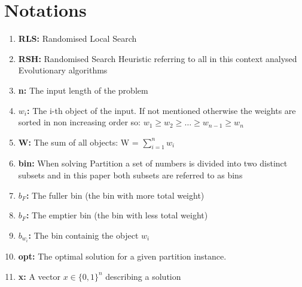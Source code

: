 \section{Notations}
\begin{enumerate}
    \item \textbf{RLS:} Randomised Local Search
    \item \textbf{RSH:} Randomised Search Heuristic referring to all in this context analysed Evolutionary algorithms
    \item \textbf{n:} The input length of the problem
    \item \textbf{$w_i$:} The i-th object of the input. If not mentioned otherwise the weights are sorted in non increasing order so: \(w_1 \ge w_2 \ge \ldots \ge w_{n-1} \ge w_{n}\)
    \item \textbf{W:} The sum of all objects: W = $\sum_{i=1}^{n}w_i$
    \item \textbf{bin:} When solving Partition a set of numbers is divided into two distinct subsets and in this paper both subsets are referred to as bins
    \item \textbf{$b_F$:} The fuller bin (the bin with more total weight)
    \item \textbf{$b_F$:} The emptier bin (the bin with less total weight)
    \item \textbf{$b_{w_i}$:} The bin containig the object $w_i$
    \item \textbf{opt:} The optimal solution for a given partition instance.
    \item \textbf{x:} A vector $x \in {\{0, 1\}}^n$ describing a solution
\end{enumerate}